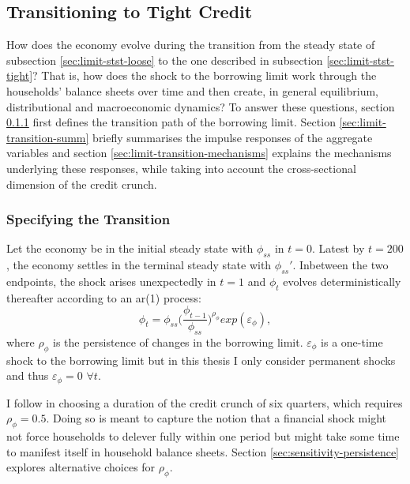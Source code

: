 \documentclass[12pt]{article} %
\numberwithin{equation}{section} %
\numberwithin{figure}{section}
\numberwithin{table}{section}
\begin{document}
\subsection{Transitioning to Tight Credit}
\label{sec:limit-transition}

How does the economy evolve during the transition from the steady state of subsection \ref{sec:limit-stst-loose} to the one described in subsection \ref{sec:limit-stst-tight}? That is, how does the shock to the borrowing limit work through the households' balance sheets over time and then create, in general equilibrium, distributional and macroeconomic dynamics? To answer these questions, section \ref{sec:limit-transition-specific} first defines the transition path of the borrowing limit. Section \ref{sec:limit-transition-summ} briefly summarises the impulse responses of the aggregate variables and section \ref{sec:limit-transition-mechanisms} explains the mechanisms underlying these responses, while taking into account the cross-sectional dimension of the credit crunch. 

\subsubsection{Specifying the Transition}
\label{sec:limit-transition-specific}

Let the economy be in the initial steady state with $\phi_{ss}$ in $t=0$. Latest by $t=200$, the economy settles in the terminal steady state with $\phi_{ss}'$. Inbetween the two endpoints, the shock arises unexpectedly in $t=1$ and $\phi_t$ evolves deterministically thereafter according to an \Gls{ar}(1) process:
\begin{equation}
    \phi_t = \phi_{ss} \Bigg( \frac{\phi_{t-1}}{\phi_{ss}} \Bigg)^{\rho_{\phi}} exp(\varepsilon_{\phi}), \label{eq:borrowing-limit-process}
\end{equation}
where $\rho_{\phi}$ is the persistence of changes in the borrowing limit. $\varepsilon_{\phi}$ is a one-time shock to the borrowing limit but in this thesis I only consider permanent shocks and thus $\varepsilon_{\phi} = 0$ $\forall t$.

I follow \textcite{gl2017} in choosing a duration of the credit crunch of six quarters, which requires $\rho_{\phi} = 0.5$. Doing so is meant to capture the notion that a financial shock might not force households to delever fully within one period but might take some time to manifest itself in household balance sheets. Section \ref{sec:sensitivity-persistence} explores alternative choices for $\rho_{\phi}$.
\end{document}
